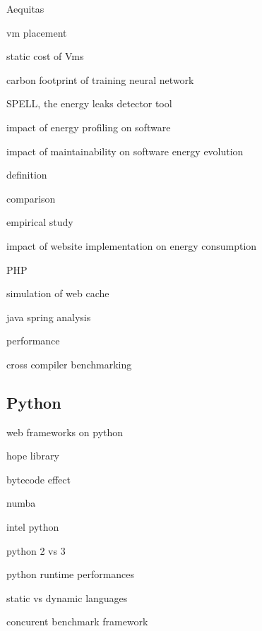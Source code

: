 Aequitas \cite{ribic2016aequitas}

vm placement \cite{mishra2018energy}

\citeauthor{mishra2018energy}

static cost of Vms \cite{kurpicz2016much}



carbon footprint of training neural network \cite{strubell2019energy}

SPELL, the energy leaks detector tool \cite{pereira2017helping}

impact of energy profiling on software \cite{jagroep2017energy}

impact of maintainability on software energy evolution \cite{calero2021does}

definition \cite{wang1993grpc}

comparison \cite{chamas2017comparing}

empirical study \cite{de2021empirical}

impact of website implementation on energy consumption \cite{philippot_characterization_2014} \cite{manotas2013investigating}

PHP \cite{benmoussa_new_2019} \cite{das_comparison_2016}

simulation of web cache \cite{cardenas_performance_2005}

java spring analysis \cite{gajewski_analysis_2019}

performance \cite{mishra2021web}


cross compiler benchmarking \cite{yet2016cross}

\subsection{Python}

web frameworks on python \cite{pankiv_concurrent_nodate}

hope library \cite{akeret_hope_2015}

bytecode effect \cite{ben_asher_effect_2009}

numba \cite{crist_dask_2016}

intel python \cite{li_boosting_2016}

python 2 vs 3 \cite{modzelewski_pyston_2020}

python runtime performances \cite{redondo_comprehensive_2015} \cite{murri_performance_2013}

static vs dynamic languages \cite{pang_what_nodate}

concurent benchmark framework \cite{pankiv2019concurrent}


